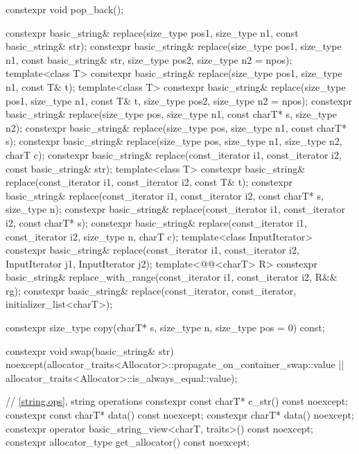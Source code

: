 \begin{codeblock}
{{    constexpr void pop_back();

    constexpr basic_string& replace(size_type pos1, size_type n1, const basic_string& str);
    constexpr basic_string& replace(size_type pos1, size_type n1, const basic_string& str,
                                    size_type pos2, size_type n2 = npos);
    template<class T>
      constexpr basic_string& replace(size_type pos1, size_type n1, const T& t);
    template<class T>
      constexpr basic_string& replace(size_type pos1, size_type n1, const T& t,
                                      size_type pos2, size_type n2 = npos);
    constexpr basic_string& replace(size_type pos, size_type n1, const charT* s, size_type n2);
    constexpr basic_string& replace(size_type pos, size_type n1, const charT* s);
    constexpr basic_string& replace(size_type pos, size_type n1, size_type n2, charT c);
    constexpr basic_string& replace(const_iterator i1, const_iterator i2,
                                    const basic_string& str);
    template<class T>
      constexpr basic_string& replace(const_iterator i1, const_iterator i2, const T& t);
    constexpr basic_string& replace(const_iterator i1, const_iterator i2, const charT* s,
                                    size_type n);
    constexpr basic_string& replace(const_iterator i1, const_iterator i2, const charT* s);
    constexpr basic_string& replace(const_iterator i1, const_iterator i2, size_type n, charT c);
    template<class InputIterator>
      constexpr basic_string& replace(const_iterator i1, const_iterator i2,
                                      InputIterator j1, InputIterator j2);
    template<@@<charT> R>
      constexpr basic_string& replace_with_range(const_iterator i1, const_iterator i2, R&& rg);
    constexpr basic_string& replace(const_iterator, const_iterator, initializer_list<charT>);

    constexpr size_type copy(charT* s, size_type n, size_type pos = 0) const;

    constexpr void swap(basic_string& str)
      noexcept(allocator_traits<Allocator>::propagate_on_container_swap::value ||
               allocator_traits<Allocator>::is_always_equal::value);

    // \ref{string.ops}, string operations
    constexpr const charT* c_str() const noexcept;
    constexpr const charT* data() const noexcept;
    constexpr       charT* data() noexcept;
    constexpr operator basic_string_view<charT, traits>() const noexcept;
    constexpr allocator_type get_allocator() const noexcept;

}}
\end{codeblock}
